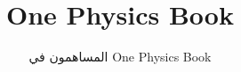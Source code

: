 \documentclass[11pt,a4paper,twoside,openany]{book}
\title{One Physics Book}
\author{المساهمون في One Physics Book}
\date{\bookdate}
\begin{document}
\frontmatter



\tableofcontents

\mainmatter





\appendix
\part{\omsolutionspart}




\backmatter
\printindex
\end{document}

